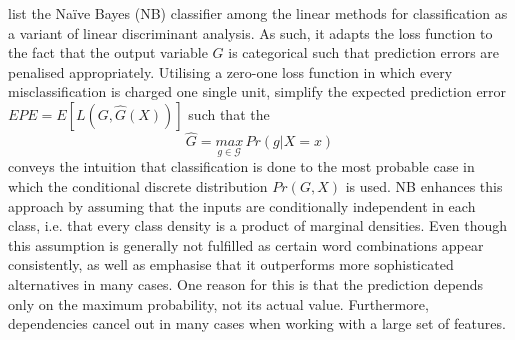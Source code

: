 \textcite[p.~211]{Friedman.2001} list the Na\"{i}ve Bayes (NB) classifier among the linear methods for classification as a variant of linear discriminant analysis. As such, it adapts the loss function to the fact that the output variable $G$ is categorical such that prediction errors are penalised appropriately. Utilising a zero-one loss function in which every misclassification is charged one single unit, \textcite[pp.~20-21]{Friedman.2001} simplify the expected prediction error $EPE=E[L(G,\hat{G}(X))]$ such that the 
%
\begin{equation}
	\hat{G} = \underset{g\in \mathcal{G}}{max}\, Pr(g|X=x)
\end{equation}
%
conveys the intuition that classification is done to the most probable case in which the conditional discrete distribution $Pr(G,X)$ is used. NB enhances this approach by assuming that the inputs are conditionally independent in each class, i.e. that every class density is a product of marginal densities. Even though this assumption is generally not fulfilled as certain word combinations appear consistently, \textcite{Friedman.2001} as well as \textcite{Rish.2001} emphasise that it outperforms more sophisticated alternatives in many cases. One reason for this is that the prediction depends only on the maximum probability, not its actual value. Furthermore, dependencies cancel out in many cases when working with a large set of features. 

%
